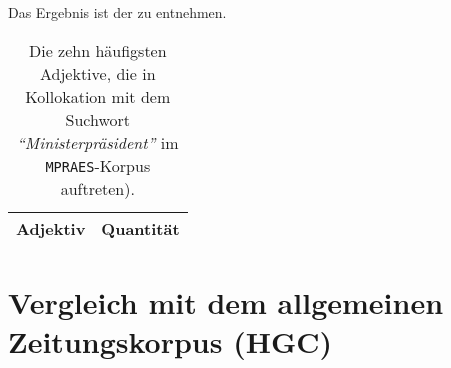 \documentclass[%
	type=document,%
  	style=article,%
  	media=print,
  	pages=oneside,%
  	prefixLecturer=Dozenten:,
  	author=multiple,
]{unihildesheim} %
\begin{document}
Das Ergebnis ist der  zu entnehmen.
\begin{table}[!hpb]\label{t}
	\center
	\begin{tabularx}{0.5\textwidth}{lr}
		\toprule
		\textbf{Adjektiv} & \textbf{Quantität}\\
		\midrule
		
		\bottomrule
	\end{tabularx}
	\caption{Die zehn häufigsten Adjektive, die in Kollokation mit dem Suchwort
	\textit{"`Ministerpräsident"'} im \texttt{MPRAES}-Korpus auftreten).}
	\label{tab:adj_mpraes}
\end{table}

\section{Vergleich mit dem allgemeinen Zeitungskorpus (HGC)}
\end{document}
